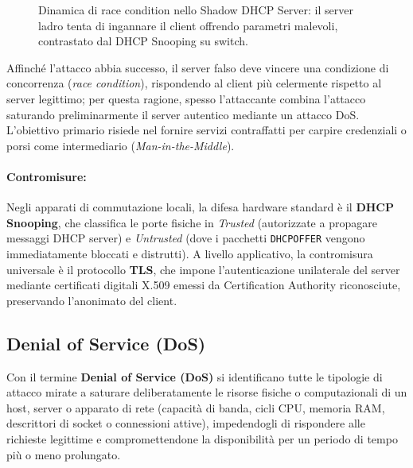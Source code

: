 \documentclass[../../main.tex]{subfiles}
\begin{document}
\begin{figure}[htbp]
{%
}
\caption{Dinamica di race condition nello Shadow DHCP Server: il server ladro tenta di ingannare il client offrendo parametri malevoli, contrastato dal DHCP Snooping su switch.}
\label{fig:rogue_server}
\end{figure}

Affinché l'attacco abbia successo, il server falso deve vincere una condizione di concorrenza (\textit{race condition}), rispondendo al client più celermente rispetto al server legittimo; per questa ragione, spesso l'attaccante combina l'attacco saturando preliminarmente il server autentico mediante un attacco DoS. L'obiettivo primario risiede nel fornire servizi contraffatti per carpire credenziali o porsi come intermediario (\textit{Man-in-the-Middle}).

\paragraph{Contromisure:}
Negli apparati di commutazione locali, la difesa hardware standard è il \textbf{DHCP Snooping}, che classifica le porte fisiche in \textit{Trusted} (autorizzate a propagare messaggi DHCP server) e \textit{Untrusted} (dove i pacchetti \texttt{DHCPOFFER} vengono immediatamente bloccati e distrutti). A livello applicativo, la contromisura universale è il protocollo \textbf{TLS}, che impone l'autenticazione unilaterale del server mediante certificati digitali X.509 emessi da Certification Authority riconosciute, preservando l'anonimato del client.

\subsection{Denial of Service (DoS)}
\label{subsec:dos}

Con il termine \textbf{Denial of Service (DoS)} si identificano tutte le tipologie di attacco mirate a saturare deliberatamente le risorse fisiche o computazionali di un host, server o apparato di rete (capacità di banda, cicli CPU, memoria RAM, descrittori di socket o connessioni attive), impedendogli di rispondere alle richieste legittime e compromettendone la disponibilità per un periodo di tempo più o meno prolungato.
\end{document}
